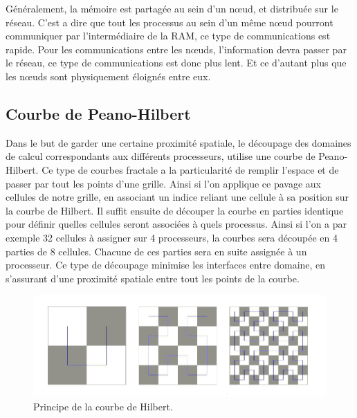 Généralement, la mémoire est partagée au sein d'un nœud, et distribuée sur le réseau.
C'est a dire que tout les processus au sein d'un même nœud pourront communiquer par l'intermédiaire de la RAM, ce type de communications est rapide.
Pour les communications entre les nœuds, l'information devra passer par le réseau, ce type de communications est donc plus lent.
Et ce d'autant plus que les nœuds sont physiquement éloignés entre eux.

\subsection{Courbe de Peano-Hilbert}
\label{sec:parasoft}



Dans le but de garder une certaine proximité spatiale, le découpage des domaines de calcul correspondants aux différents processeurs, utilise une courbe de Peano-Hilbert.
Ce type de courbes fractale a la particularité de remplir l'espace et de passer par tout les points d'une grille.
Ainsi si l'on applique ce pavage aux cellules de notre grille, en associant un indice reliant une cellule à sa position sur la courbe de Hilbert.
Il suffit ensuite de découper la courbe en parties identique pour définir quelles cellules seront associées à quels processus.
Ainsi si l'on a par exemple 32 cellules à assigner sur 4 processeurs, la courbes sera découpée en 4 parties de 8 cellules.
Chacune de ces parties sera en suite assignée à un processeur.
Ce type de découpage minimise les interfaces entre domaine, en s'assurant d'une proximité spatiale entre tout les points de la courbe.

\begin{figure}[bth]
        \includegraphics[width=.95\linewidth]{img/02/courbe_Hilbert.jpeg} 
        \caption[Courbe de Hilbert]{Principe de la courbe de Hilbert. 
 		\label{fig:hilbert}}
\end{figure}

